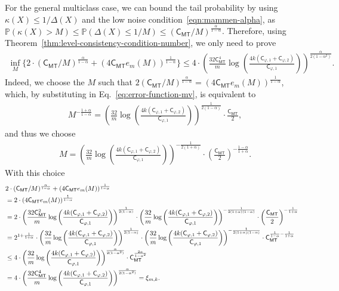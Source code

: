 \documentclass[11pt]{article}
\newcommand{\Prb}{\mathbb{P}}
\newcommand{\prn}[1]{\left({#1}\right)} %
\newcommand{\constant}{\mathsf{C}}  %
\newcommand{\cstMT}{\constant_{\mathsf{MT}}}
\newcommand{\sloss}{\varphi}  %
\begin{document}
For the general multiclass case, we can bound the tail probability by using
$\kappa(X) \leq 1/\Delta(X)$ and the low noise
condition~\eqref{eqn:mammen-alpha}, as $\Prb(\kappa(X) > M) \leq
\Prb(\Delta(X) \leq 1/M) \leq (\cstMT /
M)^{\frac{\alpha}{1-\alpha}}$.
%
Therefore, using Theorem~\ref{thm:level-consistency-condition-number},
we only need to prove
\begin{align*}
  \inf_M \{2 \cdot(\cstMT / M)^{\frac{\alpha}{1-\alpha}} +  (4\cstMT e_m(M))^{\frac{1}{1-\alpha}} \} \leq 	4 \cdot  \prn{\frac{32 \cstMT^4}{m}\log \prn{ \frac{4k(\constant_{\sloss, 1}+\constant_{\sloss, 2})}{\constant_{\sloss, 1}}}}^{\frac{\alpha}{2(1-\alpha^2)}}.
\end{align*}
Indeed, we choose the $M$ such that $2(\cstMT / M)^{\frac{\alpha}{1-\alpha}}
= (4\cstMT e_m(M))^{\frac{1}{1-\alpha}}$, which, by substituting in
Eq.~\eqref{eq:error-function-mv}, is equivalent to
\begin{align*}
	M^{-\frac{1+\alpha}{1-\alpha}} = \prn{\frac{32}{m}\log \prn{ \frac{4k(\constant_{\sloss, 1}+\constant_{\sloss, 2})}{\constant_{\sloss, 1}}}}^{\frac{1}{2(1-\alpha)}} \cdot \frac{\cstMT}{2},
\end{align*}
and thus we choose
\begin{align*}
  M =  \prn{\frac{32}{m}\log \prn{ \frac{4k(\constant_{\sloss, 1}+\constant_{\sloss, 2})}{\constant_{\sloss, 1}}}}^{-\frac{1}{2(1+\alpha)}} \cdot \prn{\frac{\cstMT}{2}}^{-\frac{1-\alpha}{1+\alpha}}.
\end{align*}
With this choice
\begin{align*}
  \lefteqn{2\cdot(\cstMT / M)^{\frac{\alpha}{1-\alpha}}+ (4\cstMT e_m(M))^{\frac{1}{1-\alpha}}} \\
  & = 2 \cdot (4\cstMT e_m(M))^{\frac{1}{1-\alpha}} \\
  & =  2 \cdot \prn{\frac{32 \cstMT^2}{m}\log \prn{ \frac{4k(\constant_{\sloss, 1}+\constant_{\sloss, 2})}{\constant_{\sloss, 1}}}}^{\frac{1}{2(1-\alpha)}} \cdot \prn{\frac{32}{m}\log \prn{ \frac{4k(\constant_{\sloss, 1}+\constant_{\sloss, 2})}{\constant_{\sloss, 1}}}}^{-\frac{1}{2(1+\alpha)(1-\alpha)}} \cdot \prn{\frac{\cstMT}{2}}^{-\frac{1}{1+\alpha}} \nonumber \\
  & =  2^{1 + \frac{1}{1+\alpha}} \cdot \prn{\frac{32}{m}\log \prn{ \frac{4k(\constant_{\sloss, 1}+\constant_{\sloss, 2})}{\constant_{\sloss, 1}}}}^{\frac{1}{2(1-\alpha)}} \cdot \prn{\frac{32}{m}\log \prn{ \frac{4k(\constant_{\sloss, 1}+\constant_{\sloss, 2})}{\constant_{\sloss, 1}}}}^{-\frac{1}{2(1+\alpha)(1-\alpha)}} \cdot \cstMT^{\frac{1}{1-\alpha}-\frac{1}{1+\alpha}} \nonumber \\
  & \leq 4 \cdot \prn{\frac{32}{m}\log \prn{ \frac{4k(\constant_{\sloss, 1}+\constant_{\sloss, 2})}{\constant_{\sloss, 1}}}}^{\frac{\alpha}{2(1-\alpha^2)}} \cdot \cstMT^{\frac{2\alpha}{1-\alpha^2}} \nonumber \\
  & = 4 \cdot  \prn{\frac{32 \cstMT^4}{m}\log \prn{ \frac{4k(\constant_{\sloss, 1}+\constant_{\sloss, 2})}{\constant_{\sloss, 1}}}}^{\frac{\alpha}{2(1-\alpha^2)}} = \xi_{m,k}.
\end{align*}
\end{document}
